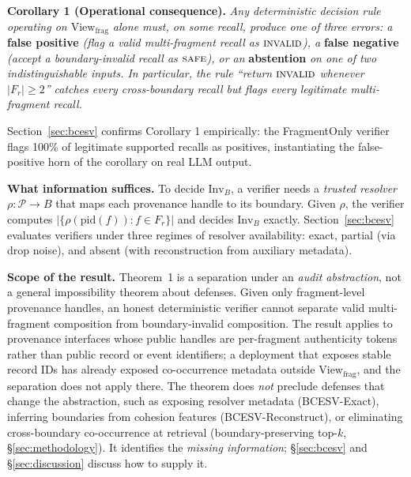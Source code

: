 \documentclass[conference,compsoc]{IEEEtran}
\begin{document}
\smallskip
\noindent\textbf{Corollary 1 (Operational consequence).}
\emph{Any deterministic decision rule operating on $\mathrm{View}_{\mathrm{frag}}$ alone must, on some recall, produce one of three errors: a} \textbf{false positive} \emph{(flag a valid multi-fragment recall as $\textsc{invalid}$), a} \textbf{false negative} \emph{(accept a boundary-invalid recall as $\textsc{safe}$), or an} \textbf{abstention} \emph{on one of two indistinguishable inputs. In particular, the rule ``return $\textsc{invalid}$ whenever $|F_{r}| \geq 2$'' catches every cross-boundary recall but flags every legitimate multi-fragment recall.}

\smallskip
Section~\ref{sec:bcesv} confirms Corollary 1 empirically: the FragmentOnly verifier flags 100\% of legitimate supported recalls as positives, instantiating the false-positive horn of the corollary on real LLM output.

\smallskip
\noindent\textbf{What information suffices.} To decide $\mathrm{Inv}_{B}$, a verifier needs a \emph{trusted resolver} $\rho: \mathcal{P} \to B$ that maps each provenance handle to its boundary. Given $\rho$, the verifier computes $|\{\rho(\mathrm{pid}(f)) : f \in F_{r}\}|$ and decides $\mathrm{Inv}_{B}$ exactly. Section~\ref{sec:bcesv} evaluates verifiers under three regimes of resolver availability: exact, partial (via drop noise), and absent (with reconstruction from auxiliary metadata).

\smallskip
\noindent\textbf{Scope of the result.} Theorem~1 is a separation under an \emph{audit abstraction}, not a general impossibility theorem about defenses. Given only fragment-level provenance handles, an honest deterministic verifier cannot separate valid multi-fragment composition from boundary-invalid composition. The result applies to provenance interfaces whose public handles are per-fragment authenticity tokens rather than public record or event identifiers; a deployment that exposes stable record IDs has already exposed co-occurrence metadata outside $\mathrm{View}_{\mathrm{frag}}$, and the separation does not apply there. The theorem does \emph{not} preclude defenses that change the abstraction, such as exposing resolver metadata (BCESV-Exact), inferring boundaries from cohesion features (BCESV-Reconstruct), or eliminating cross-boundary co-occurrence at retrieval (boundary-preserving top-$k$, \S\ref{sec:methodology}). It identifies the \emph{missing information}; \S\ref{sec:bcesv} and \S\ref{sec:discussion} discuss how to supply it.

\end{document}
